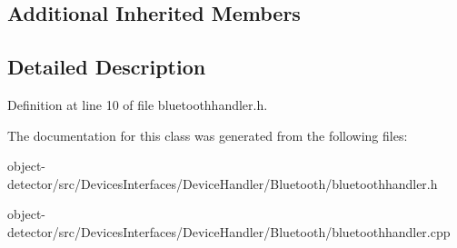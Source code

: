 \subsection*{Additional Inherited Members}


\subsection{Detailed Description}


Definition at line 10 of file bluetoothhandler.\+h.



The documentation for this class was generated from the following files\+:\begin{DoxyCompactItemize}
\item 
object-\/detector/src/\+Devices\+Interfaces/\+Device\+Handler/\+Bluetooth/bluetoothhandler.\+h\item 
object-\/detector/src/\+Devices\+Interfaces/\+Device\+Handler/\+Bluetooth/bluetoothhandler.\+cpp\end{DoxyCompactItemize}
